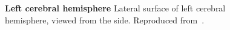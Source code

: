 \begin{figure}[htbp]
	\centering

	\caption[Left cerebral hemisphere]{\textbf{Left cerebral hemisphere}
	Lateral surface of left cerebral hemisphere, viewed from the side.
	Reproduced from~\citet{gray:1918}.}	
	\label{fig:appendix:lbrain-top}
\end{figure}

